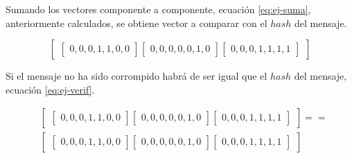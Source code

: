 Sumando los vectores componente a componente, ecuación \ref{eq:ej-suma}, anteriormente calculados, se obtiene vector a comparar con el $hash$ del mensaje. 

\begin{equation}\label{eq:ej-suma}
	\left[\begin{array}{c}
		\left[\begin{array}{c}0, 0, 0, 1, 1, 0, 0\end{array}\right]
		\left[\begin{array}{c}0, 0, 0, 0, 0, 1, 0\end{array}\right]
		\left[\begin{array}{c}0, 0, 0, 1, 1, 1, 1\end{array}\right]
	\end{array}\right]
\end{equation}

Si el mensaje no ha sido corrompido habrá de ser igual que el $hash$ del mensaje, ecuación \ref{eq:ej-verif}.

\begin{equation}\label{eq:ej-verif}
	\begin{aligned}
	&\left[\begin{array}{c}
		\left[\begin{array}{c}0, 0, 0, 1, 1, 0, 0\end{array}\right]
		\left[\begin{array}{c}0, 0, 0, 0, 0, 1, 0\end{array}\right]
		\left[\begin{array}{c}0, 0, 0, 1, 1, 1, 1\end{array}\right]
	\end{array}\right] ==\\
	&\left[\begin{array}{c}
		\left[\begin{array}{c}0, 0, 0, 1, 1, 0, 0\end{array}\right]
		\left[\begin{array}{c}0, 0, 0, 0, 0, 1, 0\end{array}\right]
		\left[\begin{array}{c}0, 0, 0, 1, 1, 1, 1\end{array}\right]
	\end{array}\right]
	\end{aligned}
\end{equation}























